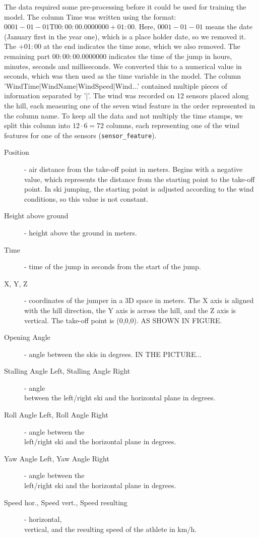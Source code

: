 \documentclass[sigconf,natbib=false, language=english]{acmart}
\begin{document}
The data required some pre-processing before it could be used for training the model.
The column Time was written using the format: $0001-01-01\text{T}00:00:00.0000000+01:00$. Here, 
$0001-01-01$ means the date (January first in the year one), which is a place holder date, so we removed it.
The $+01:00$ at the end indicates the time zone, which we also removed.
The remaining part $00:00:00.0000000$ indicates the time of the jump in hours, minutes, seconds and milliseconds.
We converted this to a numerical value in seconds, which was then used as the time variable in the model.
The column 'WindTime|WindName|WindSpeed|Wind...' contained multiple pieces of information separated by '|'.
The wind was recorded on 12 sensors placed along the hill, each measuring one of the seven wind feature in the order 
represented in the column name. To keep all the data and not multiply the time stamps, we split this 
column into $12 \cdot 6 = 72$ columns, each representing one of the wind features for one of the sensors (\texttt{sensor\_feature}).

\begin{description}
    \item[Position] - air distance from the take-off point in meters. Begins with a negative value, which
    represents the distance from the starting point to the take-off point. In ski jumping, the starting point
    is adjusted according to the wind conditions, so this value is not constant.
    \item[Height above ground] - height above the ground in meters.
    \item[Time] - time of the jump in seconds from the start of the jump.
    \item[X, Y, Z] - coordinates of the jumper in a 3D space in meters. The X axis is aligned with the hill direction,
    the Y axis is across the hill, and the Z axis is vertical. The take-off point is (0,0,0). AS SHOWN IN FIGURE.
    \item[Opening Angle] - angle between the skis in degrees. IN THE PICTURE...
    \item[Stalling Angle Left, Stalling Angle Right] - angle \\
    between the left/right ski and the horizontal plane in degrees.
    \item[Roll Angle Left, Roll Angle Right] - angle between the \\ left/right ski and the horizontal plane in degrees.
    \item[Yaw Angle Left, Yaw Angle Right] - angle between the \\ 
    left/right ski and the horizontal plane in degrees.
    \item[Speed hor., Speed vert., Speed resulting] - horizontal,\\
    vertical, and the resulting speed of the athlete in km/h.
\end{description}
\end{document}
